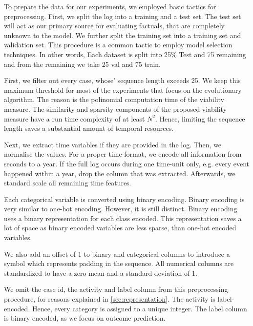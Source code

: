 \documentclass[./../../paper.tex]{subfiles}
\begin{document}
To prepare the data for our experiments, we employed basic tactics for preprocessing. First, we split the log into a training and a test set. The test set will act as our primary source for evaluating factuals, that are completely unknown to the model. We further split the training set into a training set and validation set. This procedure is a common tactic to employ model selection techniques.  In other words, Each dataset is split into 25\% Test and 75 remaining and from the remaining we take 25 val and 75 train.

First, we filter out every case, whose' sequence length exceeds 25.  We keep this maximum threshold for most of the experiments that focus on the evolutionary algorithm. The reason is the polinomial computation time of the viability measure. The similarity and sparsity components of the proposed viability measure have a run time complexity of at least $N^2$. Hence, limiting the sequence length saves a substantial amount of temporal resources.

Next, we extract time variables if they are provided in the log. Then, we normalise the values. For a proper time-format, we encode all information from seconds to a year. If the full log occurs during one time-unit only, e.g. every event happened within a year, drop the column that was extracted.  Afterwards, we standard scale all remaining time features.

Each categorical variable is converted using binary encoding. Binary encoding is very similar to one-hot encoding. However, it is still distinct. Binary encoding uses a binary representation for each class encoded. This representation saves a lot of space as binary encoded variables are less sparse, than one-hot encoded variables.


We also add an offset of 1 to binary and categorical columns to introduce a symbol which represents padding in the sequence. All numerical columns are standardized to have a zero mean and a standard deviation of 1.

We omit the case id, the activity and label column from this preprocessing procedure, for reasons explained in \autoref{sec:representation}. The activity is label-encoded. Hence, every category is assigned to a unique integer. The label column is binary encoded, as we focus on outcome prediction.


  
\end{document}
